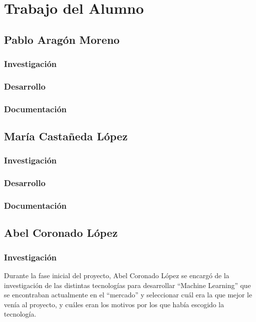 \cleardoublepage

\chapter{Trabajo del Alumno}
\label{makereference11}

\section{Pablo Aragón Moreno}
\subsection{Investigación}
\subsection{Desarrollo}
\subsection{Documentación}


\section{María Castañeda López}
\subsection{Investigación}
\subsection{Desarrollo}
\subsection{Documentación}


\section{Abel Coronado López}
\subsection{Investigación}

Durante la fase inicial del proyecto, Abel Coronado López se encargó de la investigación de las distintas tecnologías para desarrollar ``Machine Learning'' que se encontraban actualmente en el ``mercado'' y seleccionar cuál era la que mejor le venía al proyecto, y cuáles eran los motivos por los que había escogido la tecnología.

